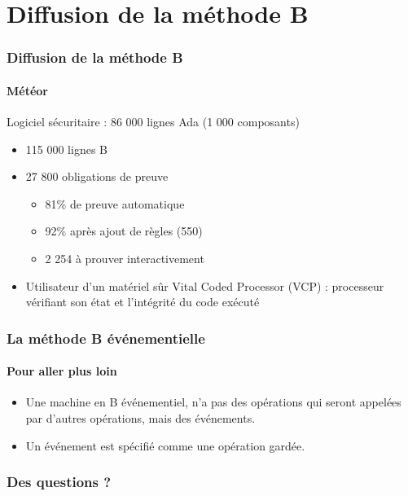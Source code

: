 \documentclass[11pt,a4paper,xcolor=table, handout]{beamer} %
\begin{document}
\section{Diffusion de la méthode B}
\begin{frame}
\frametitle{Diffusion de la méthode B}
\framesubtitle{Météor}
Logiciel sécuritaire : 86 000 lignes Ada (1 000
composants)
\begin{itemize}
\item 115 000 lignes B
\item 27 800 obligations de preuve
\begin{itemize}
\item 81\% de preuve automatique
\item 92\% après ajout de règles (550)
\item 2 254 à prouver interactivement
\end{itemize}
\item Utilisateur d'un matériel sûr Vital Coded Processor (VCP) : processeur vérifiant son état et l'intégrité du code exécuté
\end{itemize}
\end{frame}

\begin{frame}
\frametitle{La méthode B événementielle}
\framesubtitle{Pour aller plus loin}
\begin{itemize}
\item Une machine en B  événementiel, n'a pas des opérations qui seront appelées par d'autres opérations, mais des  événements.
\item Un  événement est spécifié comme une opération gardée.
\end{itemize}

\end{frame}

\begin{frame}
\frametitle{Des questions ?}

\end{frame}
\end{document}
